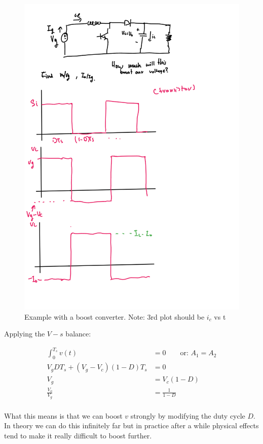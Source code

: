 \documentclass[../notes.tex]{subfiles}
\begin{document}
\begin{figure}[H]
	\centering
	\includegraphics[width=0.8\linewidth]{img/image_2022-09-26-18-29-49.png}
	\caption{Example with a boost converter. Note: 3rd plot should be $i_c$ vs t}
\end{figure}

Applying the $ V-s $ balance:

\begin{equation}
	\begin{split}
		\int_{0}^{T_s} v(t)   & = 0 \qquad \text{or: }  A_1 = A_2\\
		 V_g D  T_s + (V_g - V_c) (1-D) T_s &= 0 \\   
		 V_g &=  V_c(1-D) \\
		 \frac{V_o}{V_g}&= \frac{1}{1-D}  \\
	\end{split}
\end{equation}

What this means is that we can boost $ v $ strongly by modifying the duty cycle $ D $. In theory we can do this infinitely far but in practice after a while physical effects tend to make it really difficult to boost further.
\end{document}
